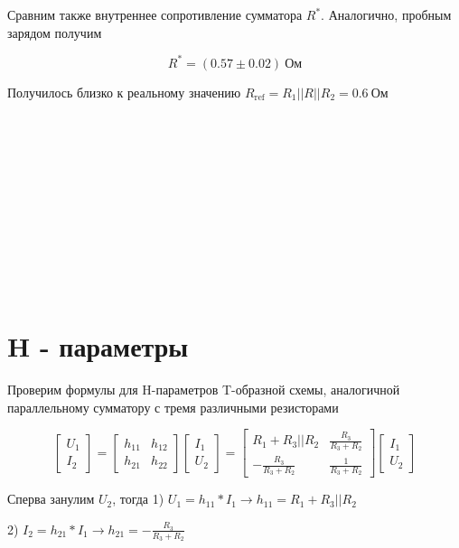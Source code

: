 \documentclass[a4paper]{article}
\begin{document}
Сравним также внутреннее сопротивление сумматора $R^*$. Аналогично, пробным зарядом получим

\begin{equation}
    R^* = (0.57 \pm 0.02) \ \text{Ом}
\end{equation}

Получилось близко к реальному значению \newline $R_\text{ref} = R_1 || R || R_2 = 0.6 \ \text{Ом}$

\\\

\\\

\\\

\\\

\section{H - параметры}

Проверим формулы для H-параметров T-образной схемы,
аналогичной параллельному сумматору с тремя различными резисторами

\[
\begin{bmatrix}
    U_1\\
    I_2
\end{bmatrix}
 =
\begin{bmatrix}
    h_{11} & h_{12}\\
    h_{21} & h_{22}
\end{bmatrix}
\begin{bmatrix}
    I_1\\
    U_2
\end{bmatrix}
 =
\begin{bmatrix}
    R_1 + R_3||R_2         & \frac{R_3}{R_3 + R_2} \\
    -\frac{R_3}{R_3 + R_2} & \frac{1}{R_3 + R_2}
\end{bmatrix}
\begin{bmatrix}
    I_1\\
    U_2
\end{bmatrix}
\]

Сперва занулим $U_2$, тогда 1) $U_1 = h_{11} * I_1 \longrightarrow h_{11} = R_1 + R_3 || R_2$

\hspace{4.2cm} 2) $I_2 = h_{21} * I_1 \longrightarrow h_{21} = -\frac{R_3}{R_3 + R_2}$

\vspace{0.3cm}
\end{document}
